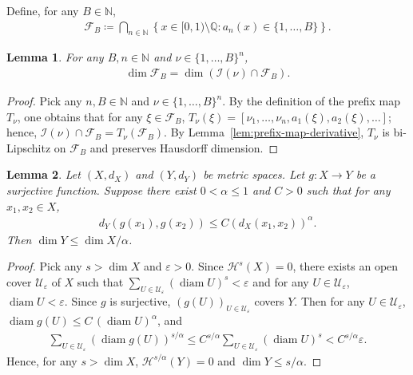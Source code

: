 \documentclass[10pt,a4paper]{amsart}
\newtheorem{lemma}{Lemma}
\DeclareMathOperator{\diam}{diam}
\begin{document}
Define, for any $B\in\mathbb{N}$, 
\begin{align*}
    \mathcal{F}_B
    \coloneqq
    \bigcap_{n\in\mathbb{N}}
    \left\{x\in[0,1)\setminus\mathbb{Q}: a_n(x)\in\{1,\ldots,B\}\right\}.
\end{align*}
\begin{lemma}
\label{lem:bounded-prefix-dimension}
For any $B,n\in\mathbb{N}$ and $\nu\in\{1,\dots,B\}^n$,
\begin{align*}
    \dim{\mathcal{F}_B}
    =\dim{\left(\mathcal{I}(\nu)\cap\mathcal{F}_B\right)}.
\end{align*}
\end{lemma}
\begin{proof}
Pick any $n,B\in\mathbb{N}$ and $\nu\in\{1,\dots,B\}^n$. 
By the definition of the prefix map $T_\nu$, one obtains that for any $\xi\in{\mathcal{F}_B}$, $T_\nu(\xi)=[\nu_1,\ldots,\nu_n,a_1(\xi),a_2(\xi),\ldots]$; hence, $\mathcal{I}(\nu)\cap \mathcal{F}_B=T_\nu(\mathcal{F}_B)$. By Lemma~\ref{lem:prefix-map-derivative}, $T_\nu$ is bi-Lipschitz on $\mathcal{F}_B$ and preserves Hausdorff dimension.
\end{proof}

\begin{lemma}
\label{lem:holder-dimension-estimate}
Let $(X,d_X)$ and $(Y,d_Y)$ be metric spaces. Let $g:X\to Y$ be a surjective function. Suppose there exist $0<\alpha\leq 1$ and $C>0$ such that for any $x_1,x_2\in X$,
\begin{align*}
    d_Y(g(x_1),g(x_2))\leq C \left(d_X(x_1,x_2)\right)^\alpha.
\end{align*}
Then $\dim{Y}\leq\dim{X}/\alpha$.
\end{lemma}
\begin{proof}
Pick any $s>\dim{X}$ and $\varepsilon>0$. Since $\mathcal{H}^s(X)=0$, there exists an open cover $\mathcal{U}_{\varepsilon}$ of $X$ such that $\sum_{U\in\mathcal{U}_{\varepsilon}}(\diam{U})^s<\varepsilon$ and for any $U\in\mathcal{U}_{\varepsilon}$, $\diam{U}<\varepsilon$. Since $g$ is surjective, $(g(U))_{U\in\mathcal{U}_{\varepsilon}}$ covers $Y$. Then for any $U\in\mathcal{U}_{\varepsilon}$, $\diam{g(U)}\leq C\,(\diam{U})^\alpha$, and
\begin{align*}
    \sum_{U\in\mathcal{U}_{\varepsilon}}(\diam{g(U)})^{s/\alpha}
    \leq C^{s/\alpha}\sum_{U\in\mathcal{U}_{\varepsilon}} (\diam{U})^s
    < C^{s/\alpha}\varepsilon.
\end{align*}
Hence, for any $s>\dim{X}$, $\mathcal{H}^{s/\alpha}(Y)=0$ and $\dim{Y}\leq s/\alpha$.
\end{proof}
\end{document}
